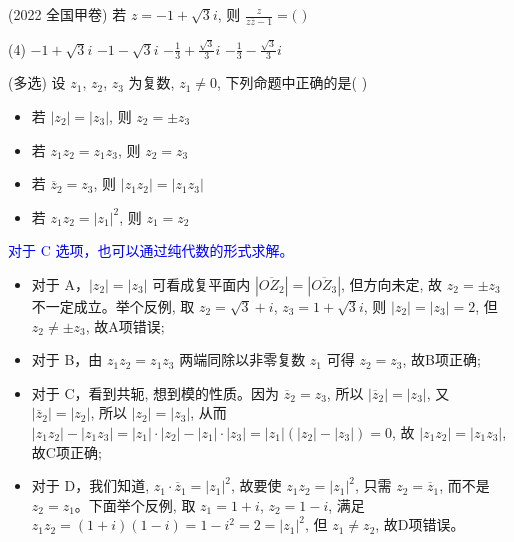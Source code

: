 \vspace{4em}

\begin{example}(2022 全国甲卷)
    若 $z=-1+\sqrt{3}i$, 则 $\frac{z}{z\overline{z}-1}=($ \quad $)$
    \begin{tasks}(4)
        \task $-1+\sqrt{3}i$
        \task $-1-\sqrt{3}i$
        \task $-\frac{1}{3}+\frac{\sqrt{3}}{3}i$
        \task $-\frac{1}{3}-\frac{\sqrt{3}}{3}i$
    \end{tasks}
\end{example}

\vspace{4em}

\begin{example}(多选)
    设 $z_{1}$, $z_{2}$, $z_{3}$ 为复数, $z_{1}\ne0$, 下列命题中正确的是( \quad )
    \begin{itemize}
        \item[A.] 若 $|z_{2}|=|z_{3}|$, 则 $z_{2}=\pm z_{3}$
        \item[B.] 若 $z_{1}z_{2}=z_{1}z_{3}$, 则 $z_{2}=z_{3}$
        \item[C.] 若 $\overline{z}_{2}=z_{3}$, 则 $|z_{1}z_{2}|=|z_{1}z_{3}|$
        \item[D.] 若 $z_{1}z_{2}=|z_{1}|^{2}$, 则 $z_{1}=z_{2}$
    \end{itemize}
    \begin{solution}
        \textcolor{blue}{对于 C 选项，也可以通过纯代数的形式求解。}
        \begin{itemize}
            \item 对于 A，$|z_{2}|=|z_{3}|$ 可看成复平面内 $|\overline{OZ_{2}}|=|\overline{OZ_{3}}|$, 但方向未定, 故 $z_2 = \pm z_3$ 不一定成立。举个反例, 取 $z_{2}=\sqrt{3}+i$, $z_{3}=1+\sqrt{3}i$, 则 $|z_{2}|=|z_{3}|=2$, 但 $z_{2}\ne\pm z_{3}$, 故A项错误;
            \item 对于 B，由 $z_{1}z_{2}=z_{1}z_{3}$ 两端同除以非零复数 $z_1$ 可得 $z_{2}=z_{3}$, 故B项正确;
            \item 对于 C，看到共轭, 想到模的性质。因为 $\overline{z}_{2}=z_{3}$, 所以 $|\overline{z}_{2}|=|z_{3}|$, 又 $|\overline{z}_{2}|=|z_{2}|$, 所以 $|z_{2}|=|z_{3}|$, 从而 $|z_{1}z_{2}|-|z_{1}z_{3}|=|z_{1}|\cdot|z_{2}|-|z_{1}|\cdot|z_{3}|=|z_{1}|(|z_{2}|-|z_{3}|)=0$, 故 $|z_{1}z_{2}|=|z_{1}z_{3}|$, 故C项正确;
            \item 对于 D，我们知道, $z_{1}\cdot\overline{z}_{1}=|z_{1}|^{2}$, 故要使 $z_1z_2 = |z_1|^2$, 只需 $z_2=\overline{z}_1$, 而不是 $z_{2}=z_{1}$。下面举个反例, 取 $z_{1}=1+i$, $z_{2}=1-i$, 满足 $z_{1}z_{2}=(1+i)(1-i)=1-i^{2}=2=|z_{1}|^{2}$, 但 $z_{1}\ne z_{2}$, 故D项错误。

\end{itemize}
\end{solution}
\end{example}
